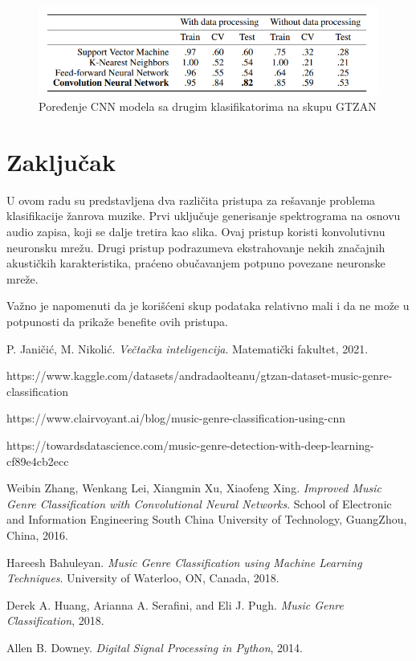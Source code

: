 \documentclass{article}
\begin{document}
\begin{figure}[h]
\centering
\includegraphics[scale=0.8]{cnn-compared}
\caption{Poređenje CNN modela sa drugim klasifikatorima na skupu GTZAN \cite{MGC}}
\end{figure}

\newpage

\section{Zaključak}

U ovom radu su predstavljena dva različita pristupa za rešavanje problema klasifikacije žanrova muzike. Prvi uključuje generisanje spektrograma na osnovu audio zapisa, koji se dalje tretira kao slika. Ovaj pristup koristi konvolutivnu neuronsku mrežu. Drugi pristup podrazumeva ekstrahovanje nekih značajnih akustičkih karakteristika, praćeno obučavanjem potpuno povezane neuronske mreže.

Važno je napomenuti da je korišćeni skup podataka relativno mali i da ne može u potpunosti da prikaže benefite ovih pristupa.

\newpage

\begin{thebibliography}{9}

    P. Janičić, M. Nikolić. \textit{Večtačka inteligencija}. Matematički fakultet, 2021.

	https://www.kaggle.com/datasets/andradaolteanu/gtzan-dataset-music-genre-classification
	
	https://www.clairvoyant.ai/blog/music-genre-classification-using-cnn

	https://towardsdatascience.com/music-genre-detection-with-deep-learning-cf89e4cb2ecc

    \bibitem{}
    Weibin Zhang, Wenkang Lei, Xiangmin Xu, Xiaofeng Xing. \textit{Improved Music Genre Classification with Convolutional Neural Networks}. School of Electronic and Information Engineering
South China University of Technology, GuangZhou, China, 2016.

	Hareesh Bahuleyan. \textit{Music Genre Classification using Machine Learning Techniques}. University of Waterloo, ON, Canada, 2018.
	
	Derek A. Huang, Arianna A. Serafini, and Eli J. Pugh. \textit{Music Genre Classification}, 2018.

	Allen B. Downey. \textit{Digital Signal Processing in Python}, 2014.
	

	

	

\end{thebibliography}
\end{document}

